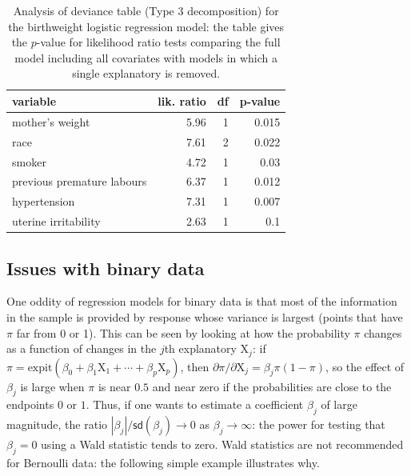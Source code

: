 \documentclass[
  11pt,
  letterpaper,
]{book}
\theoremstyle{definition}
\theoremstyle{definition}
\theoremstyle{definition}
\theoremstyle{remark}
\begin{document}
\begin{table}

\caption{\label{tab:type3birthwgt}Analysis of deviance table (Type 3 decomposition) for the birthweight logistic regression model: the table gives the $p$-value for likelihood ratio tests comparing the full model including all covariates with models in which a single explanatory is removed.}
\centering
\begin{tabular}[t]{lrrr}
\toprule
variable & lik. ratio & df & p-value\\
\midrule
mother's weight & 5.96 & 1 & 0.015\\
race & 7.61 & 2 & 0.022\\
smoker & 4.72 & 1 & 0.03\\
previous premature labours & 6.37 & 1 & 0.012\\
hypertension & 7.31 & 1 & 0.007\\
\addlinespace
uterine irritability & 2.63 & 1 & 0.1\\
\bottomrule
\end{tabular}
\end{table}

\hypertarget{issues-with-binary-data}{%
\subsection{Issues with binary data}\label{issues-with-binary-data}}

One oddity of regression models for binary data is that most of the
information in the sample is provided by response whose variance is
largest (points that have \(\pi\) far from 0 or 1). This can be seen by
looking at how the probability \(\pi\) changes as a function of changes in
the \(j\)th explanatory \(\mathrm{X}_j\): if
\(\pi = \mathrm{expit}(\beta_0 + \beta_1\mathrm{X}_1 + \cdots + \beta_p\mathrm{X}_p)\),
then \(\partial \pi/\partial \mathrm{X}_j = \beta_j \pi(1-\pi)\), so the
effect of \(\beta_j\) is large when \(\pi\) is near \(0.5\) and near zero if
the probabilities are close to the endpoints \(0\) or \(1\). Thus, if one
wants to estimate a coefficient \(\beta_j\) of large magnitude, the ratio
\(|\beta_j|/\mathsf{sd}(\beta_j) \to 0\) as \(\beta_j \to \infty\): the
power for testing that \(\beta_j=0\) using a Wald statistic tends to zero.
Wald statistics are not recommended for Bernoulli data: the following
simple example illustrates why.
\end{document}

